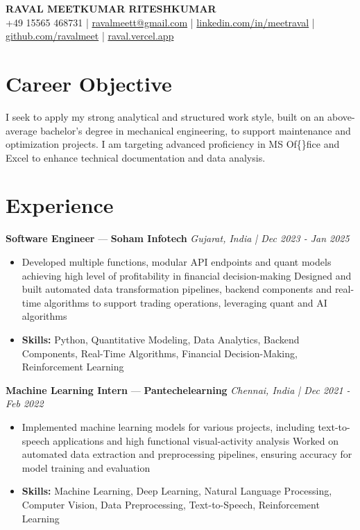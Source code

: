 \documentclass[a4paper,10pt]{article}
\begin{document}
\begin{center}
  {\Large\bfseries RAVAL MEETKUMAR RITESHKUMAR}\\[2pt]
  {\small +49 15565 468731 \;|\; \href{mailto:ravalmeett@gmail.com}{ravalmeett@gmail.com} \;|\; \href{https://www.linkedin.com/in/meetraval/}{linkedin.com/in/meetraval} \;|\; \href{https://github.com/ravalmeet}{github.com/ravalmeet} \;|\; \href{https://raval.vercel.app/}{raval.vercel.app}}
\end{center}
\vspace{-3pt}

\section*{Career Objective}
I seek to apply my strong analytical and structured work style, built on an above-average bachelor's degree in mechanical engineering, to support maintenance and optimization projects. I am targeting advanced proficiency in MS Of\{\}fice and Excel to enhance technical documentation and data analysis.\par

\section*{Experience}
\textbf{Software Engineer} — \textbf{Soham Infotech} \hfill \textit{Gujarat, India \;|\; Dec 2023 - Jan 2025}\par
\vspace{1pt}
\begin{itemize}
  \item Developed multiple functions, modular API endpoints and quant models achieving high level of profitability in financial decision-making Designed and built automated data transformation pipelines, backend components and real-time algorithms to support trading operations, leveraging quant and AI algorithms
  \item \textbf{Skills:} Python, Quantitative Modeling, Data Analytics, Backend Components, Real-Time Algorithms, Financial Decision-Making, Reinforcement Learning
\end{itemize}
\vspace{3pt}
\textbf{Machine Learning Intern} — \textbf{Pantechelearning} \hfill \textit{Chennai, India \;|\; Dec 2021 - Feb 2022}\par
\vspace{1pt}
\begin{itemize}
  \item Implemented machine learning models for various projects, including text-to-speech applications and high functional visual-activity analysis Worked on automated data extraction and preprocessing pipelines, ensuring accuracy for model training and evaluation
  \item \textbf{Skills:} Machine Learning, Deep Learning, Natural Language Processing, Computer Vision, Data Preprocessing, Text-to-Speech, Reinforcement Learning
\end{itemize}
\end{document}
